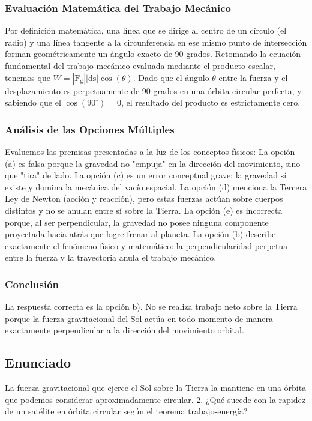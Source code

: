 \documentclass[a4paper,12pt]{article}
\begin{document}
\subsubsection*{Evaluación Matemática del Trabajo Mecánico}
Por definición matemática, una línea que se dirige al centro de un círculo (el radio) y una línea tangente a la circunferencia en ese mismo punto de intersección forman geométricamente un ángulo exacto de 90 grados.
Retomando la ecuación fundamental del trabajo mecánico evaluada mediante el producto escalar, tenemos que $W = |\text{F}_\text{g}| |\text{ds}| \cos(\theta)$. 
Dado que el ángulo $\theta$ entre la fuerza y el desplazamiento es perpetuamente de 90 grados en una órbita circular perfecta, y sabiendo que el $\cos(90^\circ) = 0$, el resultado del producto es estrictamente cero.

\subsubsection*{Análisis de las Opciones Múltiples}
Evaluemos las premisas presentadas a la luz de los conceptos físicos:
La opción (a) es falsa porque la gravedad no "empuja" en la dirección del movimiento, sino que "tira" de lado.
La opción (c) es un error conceptual grave; la gravedad sí existe y domina la mecánica del vacío espacial.
La opción (d) menciona la Tercera Ley de Newton (acción y reacción), pero estas fuerzas actúan sobre cuerpos distintos y no se anulan entre sí sobre la Tierra.
La opción (e) es incorrecta porque, al ser perpendicular, la gravedad no posee ninguna componente proyectada hacia atrás que logre frenar al planeta.
La opción (b) describe exactamente el fenómeno físico y matemático: la perpendicularidad perpetua entre la fuerza y la trayectoria anula el trabajo mecánico.

\subsubsection*{Conclusión}
La respuesta correcta es la opción b). No se realiza trabajo neto sobre la Tierra porque la fuerza gravitacional del Sol actúa en todo momento de manera exactamente perpendicular a la dirección del movimiento orbital.

\newpage
\subsection*{Enunciado}
La fuerza gravitacional que ejerce el Sol sobre la Tierra la mantiene en una órbita que podemos considerar aproximadamente circular. 
2. ¿Qué sucede con la rapidez de un satélite en órbita circular según el teorema trabajo-energía?
\end{document}
